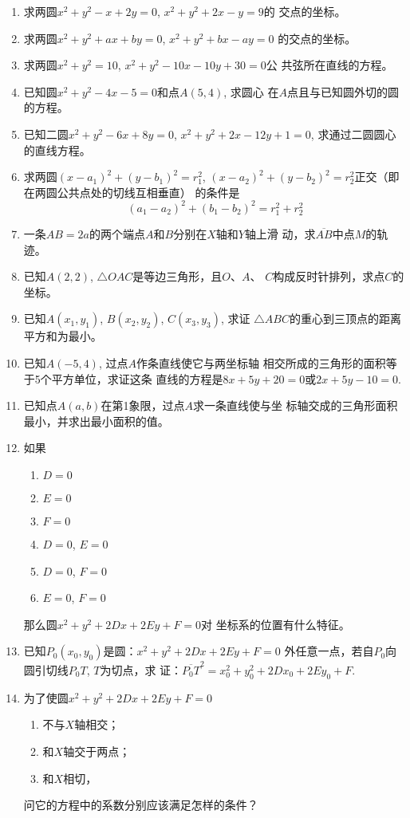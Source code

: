\begin{enumerate}
\item 求两圆$x^2+y^2-x+2y=0$, $x^2+y^2+2x-y=9$的
交点的坐标。
\item 求两圆$x^2+y^2+ax+by=0$, $x^2+y^2+bx-ay=0$
的交点的坐标。
\item 求两圆$x^2+y^2=10$, $x^2+y^2-10x-10y+30=0$公
共弦所在直线的方程。
\item 已知圆$x^2+y^2-4x-5=0$和点$A(5,4)$, 求圆心
在$A$点且与已知圆外切的圆的方程。
\item 已知二圆$x^2+y^2-6x+8y=0$, $x^2+y^2+2x-12y
+1=0$, 求通过二圆圆心的直线方程。
\item 求两圆$(x-a_1)^2+(y-b_1)^2=r^2_1$, $(x-a_2)^2+(y-
b_2)^2=r^2_2$正交（即在两圆公共点处的切线互相垂直）
的条件是
\[(a_1-a_2)^2+(b_1-b_2)^2=r_1^2+r_2^2\]
\item 一条$AB=2a$的两个端点$A$和$B$分别在$X$轴和$Y$轴上滑
动，求$\overline{AB}$中点$M$的轨迹。
\item 已知$A(2,2)$, $\triangle OAC$是等边三角形，且$O$、$A$、
$C$构成反时针排列，求点$C$的坐标。
\item 已知$A(x_1,y_1)$, $B(x_2,y_2)$, $C(x_3,y_3)$, 求证
$\triangle ABC$的重心到三顶点的距离平方和为最小。
\item 已知$A(-5,4)$, 过点$A$作条直线使它与两坐标轴
相交所成的三角形的面积等于5个平方单位，求证这条
直线的方程是$8x+5y+20=0$或$2x+5y-10=0$.
\item 已知点$A(a,b)$在第1象限，过点$A$求一条直线使与坐
标轴交成的三角形面积最小，并求出最小面积的值。

\item 如果
\begin{multicols}{2}
    \begin{enumerate}
        \item $D=0$
        \item $E=0$
        \item $F=0$
        \item $D=0$, $E=0$
        \item $D=0$, $F=0$
        \item $E=0$, $F=0$
    \end{enumerate}
\end{multicols}
那么圆$x^2+y^2+2Dx+2Ey+F=0$对
坐标系的位置有什么特征。
\item 已知$P_0(x_0,y_0)$是圆：$x^2+y^2+2Dx+2Ey+F=0$
外任意一点，若自$P_0$向圆引切线$P_0T$, $T$为切点，求
证：$\overline{P_0T}^2=x_0^2+y_0^2+2Dx_0+2Ey_0+F$.
\item 为了使圆$x^2+y^2+2Dx+2Ey+F=0$
\begin{enumerate}
\item 不与$X$轴相交；    
\item 和$X$轴交于两点；    
\item 和$X$相切，
\end{enumerate}
问它的方程中的系数分别应该满足怎样的条件？


\end{enumerate}
